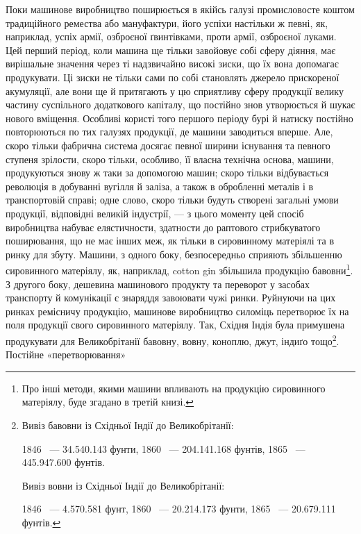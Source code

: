 Поки машинове виробництво поширюється в якійсь галузі промисловосте
коштом традиційного ремества або мануфактури, його
успіхи настільки ж певні, як, наприклад, успіх армії, озброєної
ґвинтівками, проти армії, озброєної луками. Цей перший період,
коли машина ще тільки завойовує собі сферу діяння, має вирішальне
значення через ті надзвичайно високі зиски, що їх вона
допомагає продукувати. Ці зиски не тільки сами по собі становлять
джерело прискореної акумуляції, але вони ще й притягають у
цю сприятливу сферу продукції велику частину суспільного додаткового
капіталу, що постійно знов утворюється й шукає нового
вміщення. Особливі користі того першого періоду бурі й натиску
постійно повторюються по тих галузях продукції, де
машини заводиться вперше. Але, скоро тільки фабрична система
досягає певної ширини існування та певного ступеня зрілости,
скоро тільки, особливо, її власна технічна основа, машини, продукуються
знову ж таки за допомогою машин; скоро тільки відбувається
революція в добуванні вугілля й заліза, а також в обробленні
металів і в транспортовій справі; одне слово, скоро тільки
будуть створені загальні умови продукції, відповідні великій
індустрії, — з цього моменту цей спосіб виробництва набуває елястичности,
здатности до раптового стрибкуватого поширювання, що
не має інших меж, як тільки в сировинному матеріялі та в ринку
для збуту. Машини, з одного боку, безпосередньо сприяють збільшенню
сировинного матеріялу, як, наприклад, cotton gin збільшила
продукцію бавовни\footnote{
Про інші методи, якими машини впливають на продукцію сировинного
матеріялу, буде згадано в третій книзі.
}. З другого боку, дешевина машинового
продукту та переворот у засобах транспорту й комунікації є
знаряддя завоювати чужі ринки. Руйнуючи на цих ринках ремісничу
продукцію, машинове виробництво силоміць перетворює
їх на поля продукції свого сировинного матеріялу. Так, Східня
Індія була примушена продукувати для Великобрітанії бавовну,
вовну, коноплю, джут, індиґо тощо\footnote{
\noindent{}Вивіз бавовни із Східньої Індії до Великобрітанії:

\noindent{}1846~ — \num{34.540.143} фунти, 1860~ — \num{204.141.168} фунтів, 1865~ —
\num{445.947.600} фунтів.

\noindent{}Вивіз вовни із Східньої Індії до Великобрітанії:

\noindent{}1846~ — \num{4.570.581} фунт, 1860~ — \num{20.214.173} фунти, 1865~ —
\num{20.679.111} фунтів.
}. Постійне «перетворювання»
